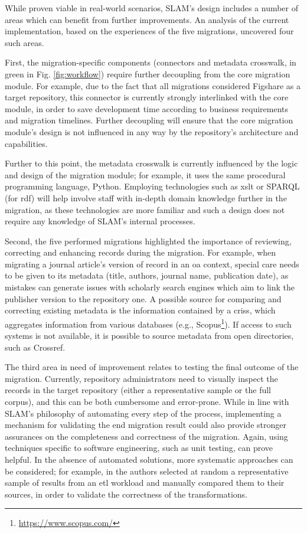 While proven viable in real-world scenarios, SLAM's design includes a number of areas which can benefit from further improvements. An analysis of the current implementation, based on the experiences of the five migrations, uncovered four such areas.

First, the migration-specific components (connectors and metadata crosswalk, in green in Fig. \ref{fig:workflow}) require further decoupling from the core migration module. For example, due to the fact that all migrations considered Figshare as a target repository, this connector is currently strongly interlinked with the core module, in order to save development time according to business requirements and migration timelines. Further decoupling will ensure that the core migration module's design is not influenced in any way by the repository's architecture and capabilities.

Further to this point, the metadata crosswalk is currently influenced by the logic and design of the migration module; for example, it uses the same procedural programming language, Python. Employing technologies such as \gls{xslt} or SPARQL (for \gls{rdf}) will help involve staff with in-depth domain knowledge further in the migration, as these technologies are more familiar and such a design does not require any knowledge of SLAM's internal processes.

Second, the five performed migrations highlighted the importance of reviewing, correcting and enhancing records during the migration. For example, when migrating a journal article's version of record in an \gls{oa} context, special care needs to be given to its metadata (title, authors, journal name, publication date), as mistakes can generate issues with scholarly search engines which aim to link the publisher version to the repository one. A possible source for comparing and correcting existing metadata is the information contained by a \glspl{cris}, which aggregates information from various databases (e.g., Scopus\footnote{\url{https://www.scopus.com/}}). If access to such systems is not available, it is possible to source metadata from open directories, such as Crossref.

The third area in need of improvement relates to testing the final outcome of the migration. Currently, repository administrators need to visually inspect the records in the target repository (either a representative sample or the full corpus), and this can be both cumbersome and error-prone. While in line with SLAM's philosophy of automating every step of the process, implementing a mechanism for validating the end migration result could also provide stronger assurances on the completeness and correctness of the migration. Again, using techniques specific to software engineering, such as unit testing, can prove helpful. In the absence of automated solutions, more systematic approaches can be considered; for example, in \cite{denney} the authors selected at random a representative sample of results from an \gls{etl} workload and manually compared them to their sources, in order to validate the correctness of the transformations.

